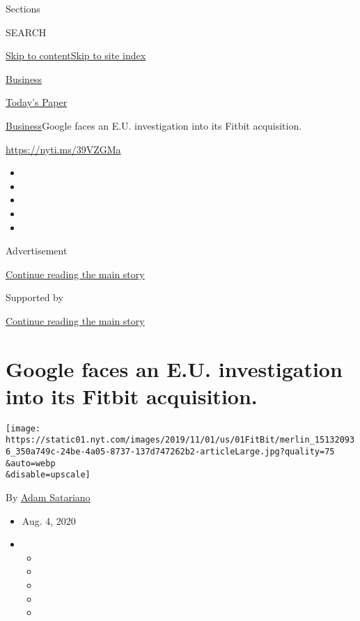 Sections

SEARCH

\protect\hyperlink{site-content}{Skip to
content}\protect\hyperlink{site-index}{Skip to site index}

\href{https://www.nytimes.com/section/business}{Business}

\href{https://myaccount.nytimes.com/auth/login?response_type=cookie\&client_id=vi}{}

\href{https://www.nytimes.com/section/todayspaper}{Today's Paper}

\href{/section/business}{Business}\textbar{}Google faces an E.U.
investigation into its Fitbit acquisition.

\url{https://nyti.ms/39VZGMa}

\begin{itemize}
\item
\item
\item
\item
\item
\end{itemize}

Advertisement

\protect\hyperlink{after-top}{Continue reading the main story}

Supported by

\protect\hyperlink{after-sponsor}{Continue reading the main story}

\hypertarget{google-faces-an-eu-investigation-into-its-fitbit-acquisition}{%
\section{Google faces an E.U. investigation into its Fitbit
acquisition.}\label{google-faces-an-eu-investigation-into-its-fitbit-acquisition}}

\texttt{[image: https://static01.nyt.com/images/2019/11/01/us/01FitBit/merlin\_151320936\_350a749c-24be-4a05-8737-137d747262b2-articleLarge.jpg?quality=75\\\&auto=webp\\\&disable=upscale]}

By \href{https://www.nytimes.com/by/adam-satariano}{Adam Satariano}

\begin{itemize}
\item
  Aug. 4, 2020
\item
  \begin{itemize}
  \item
  \item
  \item
  \item
  \item
  \end{itemize}
\end{itemize}

